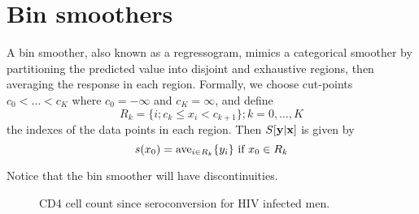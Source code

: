 \section{Bin smoothers}
A bin smoother, also known as a regressogram, mimics a categorical
smoother by partitioning the predicted value into disjoint and
exhaustive regions, then averaging the response in each
region. Formally, we choose cut-points $c_0 < \dots <c_K$ where $c_0 =
-\infty$ and $c_K = \infty$, and define
\[
R_k = \{i; c_k \leq x_i < c_{k+1} \}; k=0,\dots,K
\]
the indexes of the data points in each region. Then $S[{\mathbf y}|{\mathbf x}]$ is
given by 
\[
s(x_0) = \mbox{ave}_{i \in R_k}\{ y_i \} \mbox{ if } x_0 \in R_k
\]

Notice that the bin smoother will have discontinuities. 


\begin{figure}[htp]
\caption{\label{f2.3} CD4 cell count since seroconversion for HIV
  infected men.} 
\centerline{}
\end{figure}

